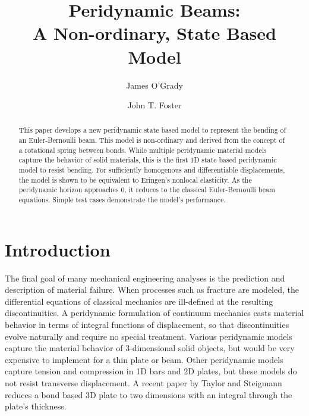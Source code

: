 \documentclass[11pt]{amsart}
\title{Peridynamic Beams: \\ A Non-ordinary, State Based Model}
\author{James O'Grady \and John T. Foster}
\begin{document}
\begin{abstract}
This paper develops a new peridynamic state based model to represent the bending of an Euler-Bernoulli beam.
This model is non-ordinary and derived from the concept of a rotational spring between bonds.
While multiple peridynamic material models capture the behavior of solid materials, this is the first 1D state based peridynamic model to resist bending.
For sufficiently homogenous and differentiable displacements, the model is shown to be equivalent to Eringen's nonlocal elasticity.
As the peridynamic horizon approaches 0, it reduces to the classical Euler-Bernoulli beam equations.
Simple test cases demonstrate the model's performance.
\end{abstract}

\maketitle

\section{Introduction}
The final goal of many mechanical engineering analyses is the prediction and description of material failure.
When processes such as fracture are modeled, the differential equations of classical mechanics are ill-defined at the resulting discontinuities.
A peridynamic formulation of continuum mechanics casts material behavior in terms of integral functions of displacement, so that discontinuities evolve naturally and require no special treatment.
Various peridynamic models capture the material behavior of 3-dimensional solid objects, but would be very expensive to implement for a thin plate or beam.
Other peridynamic models capture tension and compression in 1D bars and 2D plates, but these models do not resist transverse displacement.
A recent paper by Taylor and Steigmann \cite{taylor2013two} reduces a bond based 3D plate to two dimensions with an integral through the plate's thickness.
\end{document}
